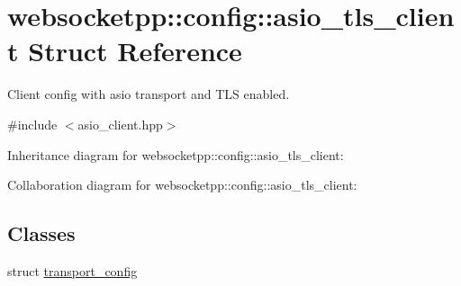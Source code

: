 \hypertarget{structwebsocketpp_1_1config_1_1asio__tls__client}{}\section{websocketpp\+:\+:config\+:\+:asio\+\_\+tls\+\_\+client Struct Reference}
\label{structwebsocketpp_1_1config_1_1asio__tls__client}


Client config with asio transport and T\+LS enabled.  




{\ttfamily \#include $<$asio\+\_\+client.\+hpp$>$}



Inheritance diagram for websocketpp\+:\+:config\+:\+:asio\+\_\+tls\+\_\+client\+:


Collaboration diagram for websocketpp\+:\+:config\+:\+:asio\+\_\+tls\+\_\+client\+:
\subsection*{Classes}
\begin{DoxyCompactItemize}
\item 
struct \mbox{\hyperlink{structwebsocketpp_1_1config_1_1asio__tls__client_1_1transport__config}{transport\+\_\+config}}
\end{DoxyCompactItemize}

